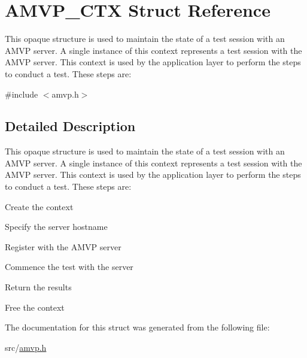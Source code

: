 \hypertarget{structAMVP__CTX}{\section{A\-M\-V\-P\-\_\-\-C\-T\-X Struct Reference}
\label{structAMVP__CTX}
}


This opaque structure is used to maintain the state of a test session with an A\-M\-V\-P server. A single instance of this context represents a test session with the A\-M\-V\-P server. This context is used by the application layer to perform the steps to conduct a test. These steps are\-:  




{\ttfamily \#include $<$amvp.\-h$>$}



\subsection{Detailed Description}
This opaque structure is used to maintain the state of a test session with an A\-M\-V\-P server. A single instance of this context represents a test session with the A\-M\-V\-P server. This context is used by the application layer to perform the steps to conduct a test. These steps are\-: 


\begin{DoxyEnumerate}
\item Create the context
\item Specify the server hostname
\item Register with the A\-M\-V\-P server
\item Commence the test with the server
\item Return the results
\item Free the context 
\end{DoxyEnumerate}

The documentation for this struct was generated from the following file\-:\begin{DoxyCompactItemize}
\item 
src/\hyperlink{amvp_8h}{amvp.\-h}\end{DoxyCompactItemize}
